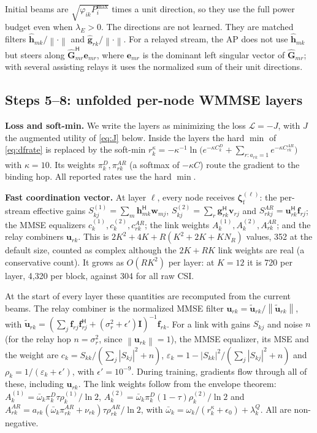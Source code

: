 \documentclass[conference]{IEEEtran}
\newcommand{\norm}[1]{\left\lVert #1 \right\rVert}
\newcommand{\abs}[1]{\left\lvert #1 \right\rvert}
\newcommand{\herm}{^{\mathsf{H}}}
\newcommand{\zf}{\boldsymbol{\zeta}_{\mathrm{f}}}
\newcommand{\Loss}{\mathcal{L}}
\begin{document}
Initial beams are $\sqrt{\varphi_{ik}P^{\max}_i}$ times a unit direction, so they
use the full power budget even when $\lambda_E>0$. The directions are not
learned. They are matched filters $\hat{\mathbf{h}}_{mk}/\norm{\cdot}$ and
$\hat{\mathbf{g}}_{rk}/\norm{\cdot}$. For a relayed stream, the AP does not
use $\hat{\mathbf{h}}_{mk}$ but steers along
$\hat{\mathbf{G}}_{mr}\herm\mathbf{e}_{mr}$, where $\mathbf{e}_{mr}$ is the
dominant left singular vector of $\hat{\mathbf{G}}_{mr}$; with several
assisting relays it uses the normalized sum of their unit directions.

\subsection{Steps 5--8: unfolded per-node WMMSE layers}\label{sec:fast}
\textbf{Loss and soft-min.} We write the layers as minimizing the loss
$\Loss = -J$, with $J$ the augmented utility of \eqref{eq:J} below. Inside
the layers the hard $\min$ of \eqref{eq:dfrate} is replaced by the soft-min
$r^\kappa_k = -\kappa^{-1}\ln\bigl(e^{-\kappa C^D_k} + \sum_{r:a_{rk}=1}
e^{-\kappa C^{AR}_{rk}}\bigr)$ with $\kappa=10$. Its weights
$\pi^D_k,\pi^{AR}_{rk}$ (a softmax of $-\kappa C$) route the gradient to the
binding hop. All reported rates use the hard $\min$.

\textbf{Fast coordination vector.} At layer $\ell$, every node receives
$\zf^{(\ell)}$: the per-stream effective gains
$S^{(1)}_{kj} = \sum_m \mathbf{h}_{mk}\herm\mathbf{w}_{mj}$,
$S^{(2)}_{kj} = \sum_r \mathbf{g}_{rk}\herm\mathbf{v}_{rj}$ and
$S^{AR}_{rkj} = \mathbf{u}_{rk}\herm\mathbf{f}_{rj}$; the MMSE equalizers
$c^{(1)}_k, c^{(2)}_k, c^{AR}_{rk}$; the link weights
$A^{(1)}_k, A^{(2)}_k, A^{AR}_{rk}$; and the relay combiners
$\mathbf{u}_{rk}$. This is $2K^2+4K+R(K^2+2K+KN_R)$ values, 352 at the
default size, counted as complex although the $2K+RK$ link weights are real
(a conservative count). It grows as $O(RK^2)$ per layer: at $K=12$ it is 720
per layer, 4{,}320 per block, against 304 for all raw CSI.

At the start of every layer these quantities are recomputed from the current
beams. The relay combiner is the normalized MMSE filter
$\mathbf{u}_{rk} = \tilde{\mathbf{u}}_{rk}/\norm{\tilde{\mathbf{u}}_{rk}}$,
with $\tilde{\mathbf{u}}_{rk} = (\sum_j\mathbf{f}_{rj}\mathbf{f}_{rj}\herm
+ (\sigma_r^2+\epsilon')\mathbf{I})^{-1}\mathbf{f}_{rk}$. For a link with
gains $S_{kj}$ and noise $n$ (for the relay hop $n=\sigma_r^2$, since
$\norm{\mathbf{u}_{rk}}=1$), the MMSE equalizer, its MSE and the weight are
$c_k = S_{kk}/(\sum_j\abs{S_{kj}}^2+n)$,
$\varepsilon_k = 1-\abs{S_{kk}}^2/(\sum_j\abs{S_{kj}}^2+n)$ and
$\rho_k = 1/(\varepsilon_k+\epsilon')$, with $\epsilon'=10^{-9}$. During
training, gradients flow through all of these, including $\mathbf{u}_{rk}$.
The link weights follow from the envelope theorem:
$A^{(1)}_k = \bar\omega_k\pi^D_k\tau\rho^{(1)}_k/\ln2$,
$A^{(2)}_k = \bar\omega_k\pi^D_k(1-\tau)\rho^{(2)}_k/\ln2$ and
$A^{AR}_{rk} = a_{rk}(\bar\omega_k\pi^{AR}_{rk}+\nu_{rk})
\tau\rho^{AR}_{rk}/\ln2$, with
$\bar\omega_k = \omega_k/(r^\kappa_k+\epsilon_0)+\lambda^Q_k$. All are
non-negative.
\end{document}
